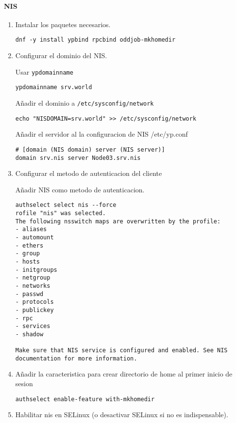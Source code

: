 \documentclass[../main.tex]{subfiles}
\begin{document}
\paragraph{NIS}
\begin{enumerate}
\item Instalar los paquetes necesarios.
  \begin{lstlisting}
dnf -y install ypbind rpcbind oddjob-mkhomedir
\end{lstlisting}
\item Configurar el dominio del NIS.\@

  Usar \lstinline|ypdomainname|
  \begin{lstlisting}
ypdomainname srv.world
\end{lstlisting}

Añadir el dominio a \lstinline|/etc/sysconfig/network|

\begin{lstlisting}
echo "NISDOMAIN=srv.world" >> /etc/sysconfig/network 
\end{lstlisting}

Añadir el servidor al la configuracion de NIS /etc/yp.conf
\begin{lstlisting}
# [domain (NIS domain) server (NIS server)]
domain srv.nis server Node03.srv.nis 
\end{lstlisting}

\item Configurar el metodo de autenticacion del cliente

  Añadir NIS como metodo de autenticacion.

  \begin{lstlisting}
authselect select nis --force
rofile "nis" was selected.
The following nsswitch maps are overwritten by the profile:
- aliases
- automount
- ethers
- group
- hosts
- initgroups
- netgroup
- networks
- passwd
- protocols
- publickey
- rpc
- services
- shadow

Make sure that NIS service is configured and enabled. See NIS documentation for more information.
\end{lstlisting}

\item Añadir la caracteristica para crear directorio de home
  al primer inicio de sesion

  \begin{lstlisting}
authselect enable-feature with-mkhomedir 
\end{lstlisting}

\item Habilitar nis en SELinux (o desactivar SELinux si no es indispensable).


\end{enumerate}
\end{document}
